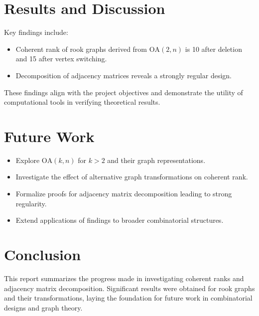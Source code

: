 \documentclass[12pt]{article}
\begin{document}
\section{Results and Discussion}
Key findings include:
\begin{itemize}
    \item Coherent rank of rook graphs derived from \(\text{OA}(2, n)\) is 10 after deletion and 15 after vertex switching.
    \item Decomposition of adjacency matrices reveals a strongly regular design.
\end{itemize}
These findings align with the project objectives and demonstrate the utility of computational tools in verifying theoretical results.

\section{Future Work}
\begin{itemize}
    \item Explore \(\text{OA}(k, n)\) for \(k > 2\) and their graph representations.
    \item Investigate the effect of alternative graph transformations on coherent rank.
    \item Formalize proofs for adjacency matrix decomposition leading to strong regularity.
    \item Extend applications of findings to broader combinatorial structures.
\end{itemize}

\section{Conclusion}
This report summarizes the progress made in investigating coherent ranks and adjacency matrix decomposition. Significant results were obtained for rook graphs and their transformations, laying the foundation for future work in combinatorial designs and graph theory.




\end{document}
